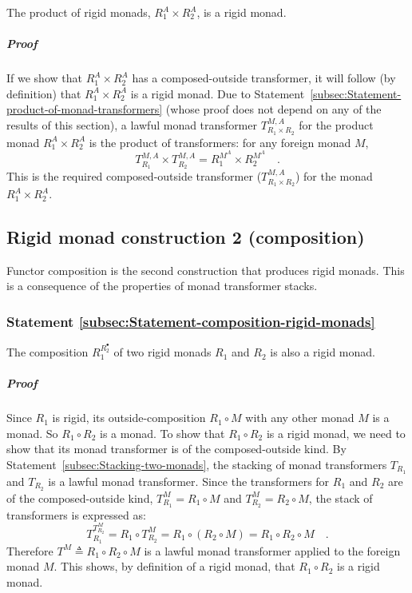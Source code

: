 The product of rigid monads, $R_{1}^{A}\times R_{2}^{A}$, is a rigid
monad.

\subparagraph{Proof}

If we show that $R_{1}^{A}\times R_{2}^{A}$ has a composed-outside
transformer, it will follow (by definition) that $R_{1}^{A}\times R_{2}^{A}$
is a rigid monad. Due to Statement~\ref{subsec:Statement-product-of-monad-transformers}
(whose proof does not depend on any of the results of this section),
a lawful monad transformer $T_{R_{1}\times R_{2}}^{M,A}$ for the
product monad $R_{1}^{A}\times R_{2}^{A}$ is the product of transformers:
for any foreign monad $M$,
\[
T_{R_{1}}^{M,A}\times T_{R_{2}}^{M,A}=R_{1}^{M^{A}}\times R_{2}^{M^{A}}\quad.
\]
This is the required composed-outside transformer ($T_{R_{1}\times R_{2}}^{M,A}$)
for the monad $R_{1}^{A}\times R_{2}^{A}$.

\subsection{Rigid monad construction 2 (composition)}

Functor composition is the second construction that produces rigid
monads. This is a consequence of the properties of monad transformer
stacks.

\subsubsection{Statement \label{subsec:Statement-composition-rigid-monads}\ref{subsec:Statement-composition-rigid-monads}}

The composition $R_{1}^{R_{2}^{\bullet}}$ of two rigid monads $R_{1}$
and $R_{2}$ is also a rigid monad.

\subparagraph{Proof}

Since $R_{1}$ is rigid, its outside-composition $R_{1}\circ M$ with
any other monad $M$ is a monad. So $R_{1}\circ R_{2}$ is a monad.
To show that $R_{1}\circ R_{2}$ is a rigid monad, we need to show
that its monad transformer is of the composed-outside kind. By Statement~\ref{subsec:Stacking-two-monads},
the stacking of monad transformers $T_{R_{1}}$and $T_{R_{2}}$ is
a lawful monad transformer. Since the transformers for $R_{1}$ and
$R_{2}$ are of the composed-outside kind, $T_{R_{1}}^{M}=R_{1}\circ M$
and $T_{R_{2}}^{M}=R_{2}\circ M$, the stack of transformers is expressed
as:
\[
T_{R_{1}}^{T_{R_{2}}^{M}}=R_{1}\circ T_{R_{2}}^{M}=R_{1}\circ(R_{2}\circ M)=R_{1}\circ R_{2}\circ M\quad.
\]
Therefore $T^{M}\triangleq R_{1}\circ R_{2}\circ M$ is a lawful monad
transformer applied to the foreign monad $M$. This shows, by definition
of a rigid monad, that $R_{1}\circ R_{2}$ is a rigid monad.


